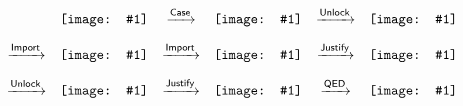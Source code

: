 \newcommand{\incl}[1]{\vcenter{\hbox{\texttt{[image: \#1]}}}}
$$
\hspace{-3em}
\begin{array}{cccccc@{\vspace{1em}}}
&\incl{flowers-prover-anim-0}
&\xstep{\action{Case}}
&\incl{flowers-prover-anim-1}
&\xstep{\action{Unlock}}
&\incl{flowers-prover-anim-2}
\\
\xstep{\action{Import}}
&\incl{flowers-prover-anim-3}
&\xstep{\action{Import}}
&\incl{flowers-prover-anim-4}
&\xstep{\action{Justify}}
&\incl{flowers-prover-anim-5}
\\
\xstep{\action{Unlock}}
&\incl{flowers-prover-anim-6}
&\xstep{\action{Justify}}
&\incl{flowers-prover-anim-7}
&\xstep{\action{QED}}
&\incl{flowers-prover-anim-8}
\end{array}
$$